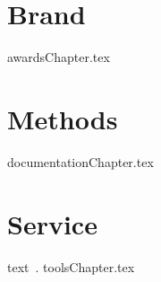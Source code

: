 \documentclass[openany]{book}  %
\title{}  %
\begin{document}
\frontmatter %

\maketitle %

\tableofcontents %
	
\mainmatter %


\part{Brand} %
{awardsChapter.tex}	
	
\part{Methods}
{documentationChapter.tex}	
			
\part{Service}
text~\cite[pg.4]{standalone1.3}.
{toolsChapter.tex}


%

\end{document}
